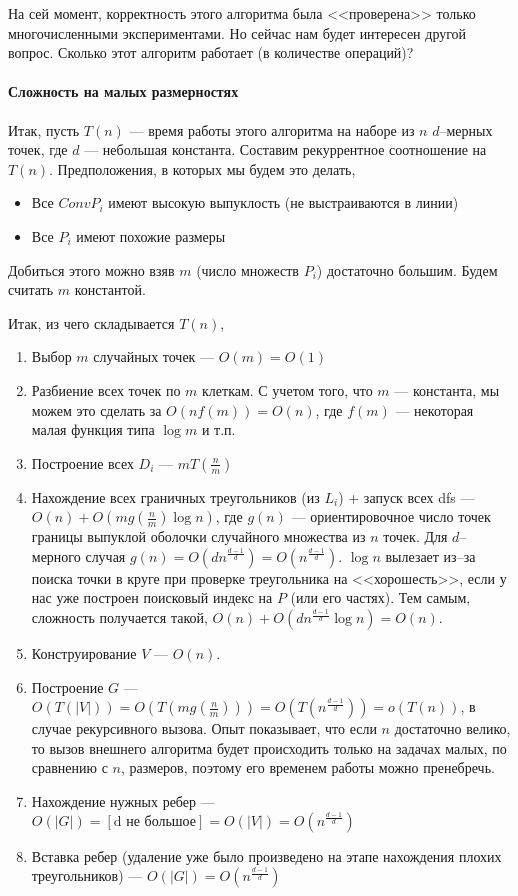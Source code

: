 \documentclass{article}
\begin{document}
    На сей момент, корректность этого алгоритма была <<проверена>> только многочисленными экспериментами. Но сейчас нам будет интересен другой вопрос. Сколько этот алгоритм работает (в количестве операций)?
    
    \paragraph{Сложность на малых размерностях\\}
    
    Итак, пусть $T(n)$ --- время работы этого алгоритма на наборе из $n$ $d$--мерных точек, где $d$ --- небольшая константа. Составим рекуррентное соотношение на $T(n)$. Предположения, в которых мы будем это делать,
    \begin{itemize}
        \item Все $Conv P_i$ имеют высокую выпуклость (не выстраиваются в линии)
        \item Все $P_i$ имеют похожие размеры
    \end{itemize}    	
    Добиться этого можно взяв $m$ (число множеств $P_i$) достаточно большим. Будем считать $m$ константой.
    
    Итак, из чего складывается $T(n)$,
    \begin{enumerate}
        \item Выбор $m$ случайных точек --- $O(m) = O(1)$
        \item Разбиение всех точек по $m$ клеткам. С учетом того, что $m$ --- константа, мы можем это сделать за $O(n f(m)) = O(n)$, где $f(m)$ --- некоторая малая функция типа $\log m$ и т.п.
        \item Построение всех $D_i$ --- $m T(\frac{n}{m})$
        \item Нахождение всех граничных треугольников (из $L_i$) + запуск всех dfs --- $O(n) + O(m g(\frac{n}{m}) \log n)$, где $g(n)$ --- ориентировочное число точек границы выпуклой оболочки случайного множества из $n$ точек. Для $d$--мерного случая $g(n) = O(d n^{\frac{d - 1}{d}}) = O(n^{\frac{d - 1}{d}})$. $\log n$ вылезает из--за поиска точки в круге при проверке треугольника на <<хорошесть>>, если у нас уже построен поисковый индекс на $P$ (или его частях). Тем самым, сложность получается такой, $O(n) + O(d n^{\frac{d - 1}{d}} \log n) = O(n)$.
        \item Конструирование $V$ --- $O(n)$.
        \item Построение $G$ --- $O(T(|V|)) = O(T(m g\left(\frac{n}{m}\right))) = O(T(n^\frac{d - 1}{d})) = o(T(n))$, в случае рекурсивного вызова. Опыт показывает, что если $n$ достаточно велико, то вызов внешнего алгоритма будет происходить только на задачах малых, по сравнению с $n$, размеров, поэтому его временем работы можно пренебречь.
        \item Нахождение нужных ребер --- $O(|G|) = [\textrm{d не большое}] = O(|V|) = O(n^\frac{d - 1}{d})$
        \item Вставка ребер (удаление уже было произведено на этапе нахождения плохих треугольников) --- $O(|G|) = O(n^\frac{d - 1}{d})$
    \end{enumerate}
    
\end{document}
